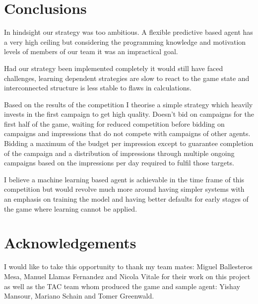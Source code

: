 \documentclass{sig-alternate-05-2015}
\begin{document}
\section{Conclusions}
In hindsight our strategy was too ambitious. A flexible predictive based agent has a very high ceiling but considering the programming knowledge and motivation levels of members of our team it was an impractical goal.  	

Had our strategy been implemented completely it would still have faced challenges, learning dependent strategies are slow to react to the game state and interconnected structure is less stable to flaws in calculations.

Based on the results of the competition I theorise a simple strategy which heavily invests in the first campaign to get high quality. Doesn't bid on campaigns for the first half of the game, waiting for reduced competition before bidding on campaigns and impressions that do not compete with campaigns of other agents. Bidding a maximum of the budget per impression except to guarantee completion of the campaign and a distribution of impressions through multiple ongoing campaigns based on the impressions per day required to fulfil those targets. 

I believe a machine learning based agent is achievable in the time frame of this competition but would revolve much more around having simpler systems with an emphasis on training the model and having better defaults for early stages of the game where learning cannot be applied. 
\section{Acknowledgements}
I would like to take this opportunity to thank my team mates: Miguel Ballesteros Mesa, Manuel Llamas Fernandez and Nicola Vitale for their work on this project as well as the TAC team whom produced the game and sample agent: Yishay Mansour, Mariano Schain and Tomer Greenwald.

\appendix
\end{document}
